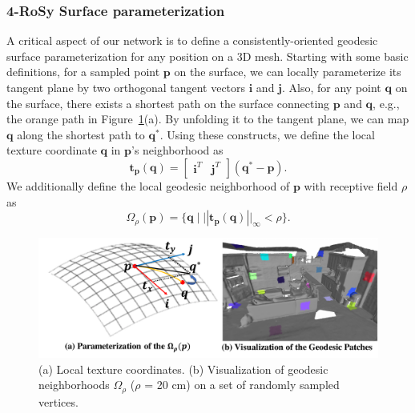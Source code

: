 \subsubsection{4-RoSy Surface parameterization}
\label{sec:texturenet-approach-param}
 A critical aspect of our network is to define a consistently-oriented geodesic surface parameterization for any position on a 3D mesh. Starting with some basic definitions, for a sampled point $\mathbf{p}$ on the surface, we can locally parameterize its tangent plane by two orthogonal tangent vectors $\mathbf{i}$ and $\mathbf{j}$.  Also, for any point $\mathbf{q}$ on the surface, there exists a shortest path on the surface connecting $\mathbf{p}$ and $\mathbf{q}$, e.g., the orange path in Figure~\ref{fig:texturenet-geodesic}(a). By unfolding it to the tangent plane, we can map $\mathbf{q}$ along the shortest path to $\mathbf{q^*}$.   Using these constructs, we define the local texture coordinate $\mathbf{q}$ in $\mathbf{p}$'s neighborhood as
 \begin{equation*}
     \mathbf{t}_{\mathbf{p}}(\mathbf{q}) = \begin{bmatrix}
     \mathbf{i}^T & \mathbf{j}^T
     \end{bmatrix}(\mathbf{q}^*-\mathbf{p}).
 \end{equation*}
 We additionally define the local geodesic neighborhood of $\mathbf{p}$ with receptive field $\rho$ as
\begin{equation}
\Omega_\rho(\mathbf{p}) = \{\mathbf{q}\;|\;||\mathbf{t}_{\mathbf{p}}(\mathbf{q})||_\infty < \rho\}.
\label{eq:texturenet-omega}
\end{equation}
\begin{figure}
    \centering
    \includegraphics[width=\linewidth]{texturenet/geodesic/neighbor.pdf}
    \caption{(a) Local texture coordinates. (b) Visualization of geodesic neighborhoods $\Omega_\rho$ ($\rho$ = 20 cm) on a set of randomly sampled vertices.}
    \label{fig:texturenet-geodesic}
\end{figure}
